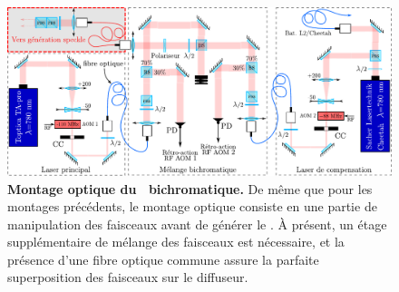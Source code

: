 \begin{figure}
\centering
\includegraphics[width=\textwidth]{Fig/Speckle/montage_speckle_bichromatique.pdf}
\caption{\textbf{Montage optique du \speckle\ bichromatique.} De même que pour les montages précédents, le montage optique consiste en une partie de manipulation des faisceaux avant de générer le \speckle . À présent, un étage supplémentaire de mélange des faisceaux est nécessaire, et la présence d'une fibre optique commune assure la parfaite superposition des faisceaux sur le diffuseur.}
\label{fig:montage_speckle_bichromatique}
\end{figure}

